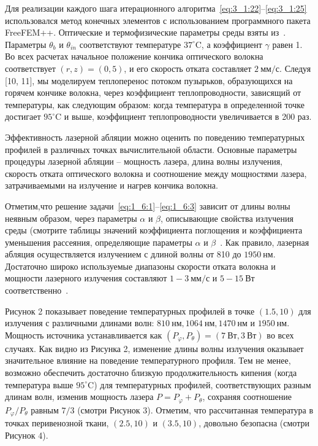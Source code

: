 Для реализации каждого шага итерационного
алгоритма~\eqref{eq:3_1:22}--\eqref{eq:3_1:25}
использовался метод конечных элементов с использованием
программного пакета FreeFEM++\cite{Hecht2012}.
Оптические и термофизические параметры среды
взяты из~\cite{Opticalthermal_vanRuijven2014}.
Параметры $\theta_{b}$ и $\theta_{i n}$ соответствуют
температуре $37^{\circ} \mathrm{C}$, а коэффициент $\gamma$ равен 1.
Во всех расчетах начальное положение кончика оптического волокна
соответствует $(r, z)=(0,5)$, и его скорость отката составляет
$2 \mathrm{~мм} / \mathrm{с}$.
Следуя [10, 11], мы моделируем теплоперенос потоком пузырьков,
образующихся на горячем кончике волокна, через коэффициент теплопроводности,
зависящий от температуры, как следующим образом: когда температура
в определенной точке достигает $95^{\circ} \mathrm{C}$ и выше,
коэффициент теплопроводности увеличивается в 200 раз.

Эффективность лазерной абляции можно оценить по поведению
температурных профилей в различных точках вычислительной области.
Основные параметры процедуры лазерной абляции -- мощность лазера,
длина волны излучения, скорость отката оптического волокна и
соотношение между мощностями лазера, затрачиваемыми на
излучение и нагрев кончика волокна.

Отметим,что решение задачи~\eqref{eq:1_6:1}--\eqref{eq:1_6:3} зависит от длины
волны неявным образом, через параметры $\alpha$ и $\beta$,
описывающие свойства излучения среды (смотрите таблицы значений коэффициента
поглощения и коэффициента уменьшения рассеяния, определяющие параметры
$\alpha$ и $\beta$~\cite{Opticalthermal_vanRuijven2014, Some_Poluektova2014}.
Как правило, лазерная абляция осуществляется излучением с длиной волны
от 810 до $1950 \mathrm{~нм}$.
Достаточно широко используемые диапазоны скорости отката волокна и мощности
лазерного излучения составляют $1-3 \mathrm{~мм} / \mathrm{с}$
и $5-15 \mathrm{~Вт}$
соответственно~\cite{
    Mathematical_Mordon2006,
    Opticalthermal_vanRuijven2014,
    Some_Poluektova2014
}.

Рисунок 2 показывает поведение температурных профилей в точке $(1.5,10)$ для
излучения с различными длинами волн: $810 \mathrm{~нм}, 1064 \mathrm{~нм},
1470 \mathrm{~нм}$ и $1950 \mathrm{~нм}$.
Мощность источника устанавливается как $\left(P_{\varphi}, P_{\theta}\right)
=(7 \mathrm{~Вт}, 3 \mathrm{~Вт})$ во всех случаях.
Как видно из Рисунка 2, изменение длины волны излучения оказывает
значительное влияние на поведение температурного профиля.
Тем не менее, возможно обеспечить достаточно близкую продолжительность
кипения (когда температура выше $95^{\circ} \mathrm{C}$) для температурных
профилей, соответствующих разным длинам волн, изменив мощность
лазера $P=P_{\varphi}+P_{\theta}$, сохраняя соотношение
$P_{\varphi} / P_{\theta}$ равным $7 / 3$ (смотри Рисунок 3).
Отметим, что рассчитанная температура в точках перивенозной ткани,
$(2.5,10)$ и $(3.5,10)$, довольно безопасна (смотри Рисунок 4).

